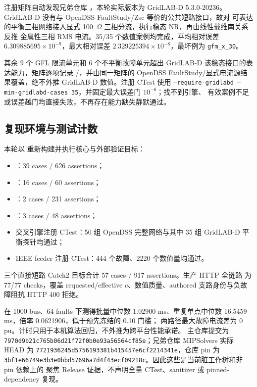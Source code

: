 注册矩阵自动发现兄弟仓库
，本轮实际版本为
GridLAB-D 5.3.0-20236。GridLAB-D 没有与 OpenDSS FaultStudy/Zsc 等价的公共短路接口，故对
可表达的平衡三相网络接入显式 100~$\Omega$ 三相分流，执行稳态 NR，再由线性戴维南关系反推
金属性三相 RMS 电流。35/35 个数值案例均完成，平均相对误差
$6.309885695\times10^{-9}$，最大相对误差 $2.329225394\times10^{-8}$，最坏例为
\texttt{gfm\_x\_30}。

其余 9 个 GFL 限流单元和 6 个不平衡故障单元超出 GridLAB-D 该稳态接口的表达能力，矩阵逐项记录
/，并由同一矩阵的 OpenDSS
FaultStudy/显式电流源结果覆盖，绝不外推 GridLAB-D 数值。注册 CTest 使用
\texttt{--require-gridlabd --min-gridlabd-cases 35}，并固定最大误差门 $10^{-6}$；找不到引擎、
有效案例不足或误差越门均直接失败，不再存在能力缺失静默通过。

\subsection{复现环境与测试计数}

本轮以  重新构建并执行核心与外部验证目标：
\begin{itemize}
  \item {}：39 cases / 626 assertions；
  \item {}：16 cases / 60 assertions；
  \item {}：2 cases / 231 assertions；
  \item {}：3 cases / 48 assertions；
  \item 交叉引擎注册 CTest：50 组 OpenDSS 完整网络与其中 35 组 GridLAB-D 平衡探针均通过；
  \item IEEE feeder 注册 CTest：444 个故障、2220 个数值量均通过。
\end{itemize}
三个直接短路 Catch2 目标合计 57 cases / 917 assertions。生产 HTTP 全链路
 为 77/77 checks，覆盖 requested/effective $c$、数值质量、authored
支路身份与负故障阻抗 HTTP 400 拒绝。

 在 1000 bus、64 faults 下测得批量中位数
1.02900 ms、重复单点中位数 16.5459 ms，倍率 0.0621906，低于预先冻结的 0.10 门槛；
两路径最大故障电流差为 0 pu。计时只用于本机算法回归，不外推为跨平台性能承诺。
主仓库提交为
\texttt{7970d9b21c76\allowbreak 5b06d21f72f0\allowbreak b0e93a56564c\allowbreak f85e}；兄弟仓库
MIPSolvers 实际 HEAD 为
\texttt{7721936245d5\allowbreak 756193381b41\allowbreak 5457e6cf2214\allowbreak 341e}，仓库 pin 为
\texttt{3bf1e66749e3\allowbreak b3e0bbd57696\allowbreak a7d4f43ecf09\allowbreak 218c}。因此这些是当前脏工作树和非 pin 依赖上的
聚焦 Release 证据，不声明全量 CTest、sanitizer 或 pinned-dependency 复现。

